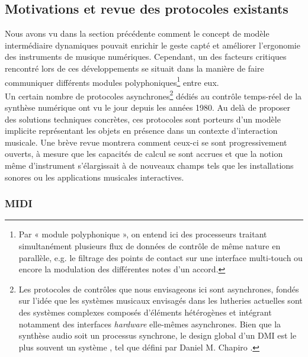 \subsection{Motivations et revue des protocoles existants}

\noindent Nous avons vu dans la section précédente comment le concept de modèle intermédiaire dynamiques pouvait enrichir le geste capté et améliorer l’ergonomie des instruments de musique numériques. Cependant, un des facteurs critiques rencontré lors de ces développements se situait dans la manière de faire communiquer différents modules polyphoniques\footnote{Par « module polyphonique », on entend ici des processeurs traitant simultanément plusieurs flux de données de contrôle de même nature en parallèle, e.g. le filtrage des points de contact sur une interface multi-touch ou encore la modulation des différentes notes d'un accord.} entre eux.\\
\indent Un certain nombre de protocoles asynchrones\footnote{Les protocoles de contrôles que nous envisageons ici sont asynchrones, fondés sur l’idée que les systèmes musicaux envisagés dans les lutheries actuelles sont des systèmes complexes composés d’éléments hétérogènes et intégrant notamment des interfaces \textit{hardware} elle-mêmes asynchrones. Bien que la synthèse audio soit un processus synchrone, le design global d'un \gls{DMI} est le plus souvent un système , tel que défini par Daniel M. Chapiro \cite{chapiro_globally-asynchronous_1984}.} dédiés au contrôle temps-réel de la synthèse numérique ont vu le jour depuis les années 1980. Au delà de proposer des solutions techniques concrètes, ces protocoles sont porteurs d’un modèle implicite représentant les objets en présence dans un contexte d'interaction musicale. Une brève revue montrera comment ceux-ci se sont progressivement ouverts, à mesure que les capacités de calcul se sont accrues et que la notion même d’instrument s’élargissait à de nouveaux champs tels que les installations sonores ou les applications musicales interactives.

\subsubsection{MIDI}

